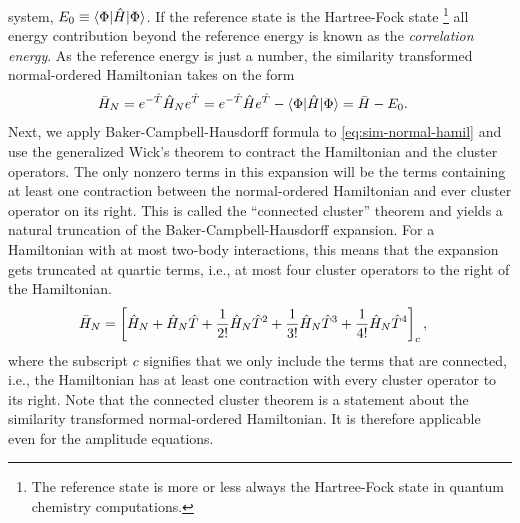             system, $E_{0} \equiv \langle \Phi |\hat{H}| \Phi \rangle$.
            If the reference state is the Hartree-Fock state%
            \footnote{
                The reference state is more or less always the Hartree-Fock
                state in quantum chemistry computations.
            }
            all energy contribution beyond the reference energy is known as the
            \emph{correlation energy}.
            As the reference energy is just a number, the similarity transformed
            normal-ordered Hamiltonian takes on the form
            \begin{align}
                \bar{H}_N
                &= e^{-\hat{T}}\hat{H}_N e^{\hat{T}}
                = e^{-\hat{T}}\hat{H} e^{\hat{T}} - \langle \Phi |\hat{H}| \Phi \rangle
                = \bar{H} - E_{0}.
                \label{eq:sim-normal-hamil}
            \end{align}
            Next, we apply Baker-Campbell-Hausdorff formula to
            \autoref{eq:sim-normal-hamil} and use the generalized Wick's theorem
            to contract the Hamiltonian and the cluster operators.
            The only nonzero terms in this expansion will be the terms
            containing at least one contraction between the normal-ordered
            Hamiltonian and ever cluster operator on its right.
            This is called the ``connected cluster'' theorem and yields a
            natural truncation of the Baker-Campbell-Hausdorff expansion.
            For a Hamiltonian with at most two-body interactions, this means
            that the expansion gets truncated at quartic terms, i.e., at most
            four cluster operators to the right of the Hamiltonian.
            \begin{align}
                \bar{H}_N
                &=
                \left[ 
                    \hat{H}_N
                    + \hat{H}_N \hat{T}
                    + \frac{1}{2!} \hat{H}_N \hat{T}^2
                    + \frac{1}{3!} \hat{H}_N \hat{T}^3
                    + \frac{1}{4!} \hat{H}_N \hat{T}^4
                 \right]_c,
            \end{align}
            where the subscript $c$ signifies that we only include the terms
            that are connected, i.e., the Hamiltonian has at least one
            contraction with every cluster operator to its right.
            Note that the connected cluster theorem is a statement about the
            similarity transformed normal-ordered Hamiltonian.
            It is therefore applicable even for the amplitude equations.

